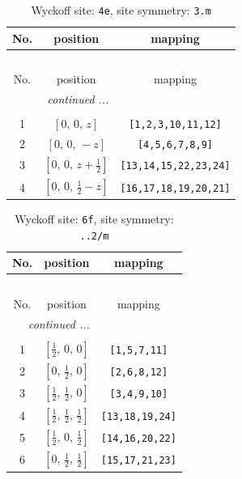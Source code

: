 \documentclass[fleqn,8pt]{jsarticle}
\begin{document}
\renewcommand{\arraystretch}{1.2}
\begin{longtable}{ccc}
\caption{Wyckoff site: {\tt 4e}, site symmetry: {\tt 3.m}}
 \\
 \hline \hline
No. & position & mapping \\ \hline \endfirsthead

\multicolumn{2}{l}{\tablename\ \thetable{}} \\
 \hline \hline
No. & position & mapping \\ \hline \endhead

 \hline \hline
\multicolumn{2}{r}{\footnotesize\it continued ...} \\ \endfoot

 \hline \hline
\multicolumn{2}{r}{} \\ \endlastfoot

1 & $\left[ 0,\, 0,\, z \right]$ & {\tt [1,2,3,10,11,12]} \\ \hline
2 & $\left[ 0,\, 0,\, - z \right]$ & {\tt [4,5,6,7,8,9]} \\ \hline
3 & $\left[ 0,\, 0,\, z + \frac{1}{2} \right]$ & {\tt [13,14,15,22,23,24]} \\ \hline
4 & $\left[ 0,\, 0,\, \frac{1}{2} - z \right]$ & {\tt [16,17,18,19,20,21]} \\
\end{longtable}
\renewcommand{\arraystretch}{1.2}
\begin{longtable}{ccc}
\caption{Wyckoff site: {\tt 6f}, site symmetry: {\tt ..2/m}}
 \\
 \hline \hline
No. & position & mapping \\ \hline \endfirsthead

\multicolumn{2}{l}{\tablename\ \thetable{}} \\
 \hline \hline
No. & position & mapping \\ \hline \endhead

 \hline \hline
\multicolumn{2}{r}{\footnotesize\it continued ...} \\ \endfoot

 \hline \hline
\multicolumn{2}{r}{} \\ \endlastfoot

1 & $\left[ \frac{1}{2},\, 0,\, 0 \right]$ & {\tt [1,5,7,11]} \\ \hline
2 & $\left[ 0,\, \frac{1}{2},\, 0 \right]$ & {\tt [2,6,8,12]} \\ \hline
3 & $\left[ \frac{1}{2},\, \frac{1}{2},\, 0 \right]$ & {\tt [3,4,9,10]} \\ \hline
4 & $\left[ \frac{1}{2},\, \frac{1}{2},\, \frac{1}{2} \right]$ & {\tt [13,18,19,24]} \\ \hline
5 & $\left[ \frac{1}{2},\, 0,\, \frac{1}{2} \right]$ & {\tt [14,16,20,22]} \\ \hline
6 & $\left[ 0,\, \frac{1}{2},\, \frac{1}{2} \right]$ & {\tt [15,17,21,23]} \\
\end{longtable}
\end{document}
